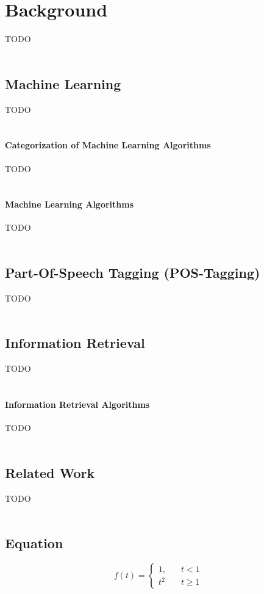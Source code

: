 \chapter{Background}
TODO\\
\\
\section{Machine Learning}\label{21_ref}
TODO\\
\\
\subsubsection{Categorization of Machine Learning Algorithms}\label{211_ref}
TODO\\
\\
\subsubsection{Machine Learning Algorithms}\label{212_ref}
TODO\\
\\
\section{Part-Of-Speech Tagging (POS-Tagging)}\label{22_ref}
TODO\\
\\
\section{Information Retrieval}\label{23_ref}
TODO\\
\\
\subsubsection{Information Retrieval Algorithms}\label{231_ref}
TODO\\
\\
\section{Related Work}\label{24_ref}
TODO\\
\\
\section{Equation}
\begin{equation}
f(t)=\left\{ \begin{array}{ll}
1,~~~~ & t< 1 \\
t^2 & t\geq 1
\end{array}\right.
\end{equation}


